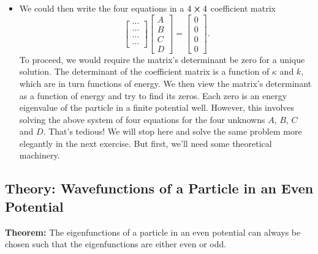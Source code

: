 \documentclass[11pt, a4paper]{article}
\begin{document}
\begin{itemize}
	\item We could then write the four equations in a $ 4 \cross 4 $ coefficient matrix
	\begin{equation*}
		\begin{bmatrix}
			\cdots \\
			\cdots \\
			\cdots \\
			\cdots 
		\end{bmatrix}
		\begin{bmatrix}
			A\\
			B\\
			C\\
			D
		\end{bmatrix}
		 = 
		 \begin{bmatrix}
		 	0\\
		 	0\\
		 	0\\
		 	0
		 \end{bmatrix}.
	\end{equation*}
	To proceed, we would require the matrix's determinant be zero for a unique solution.  The determinant of the coefficient matrix is a function of $ \kappa $ and $ k $, which are in turn functions of energy. We then view the matrix's determinant as a function of energy and try to find its zeros. Each zero is an energy eigenvalue of the particle in a finite potential well. However, this involves solving the above system of four equations for the four unknowns $ A $, $ B $, $ C $ and $ D $. That's tedious! We will stop here and solve the same problem more elegantly in the next exercise. But first, we'll need some theoretical machinery.
	
	
\end{itemize}

\subsection{Theory: Wavefunctions of a Particle in an Even Potential} \label{qmv:ss:even-odd}
 \textbf{Theorem:} The eigenfunctions of a particle in an even potential can always be chosen such that the eigenfunctions are either even or odd.
 
\end{document}
